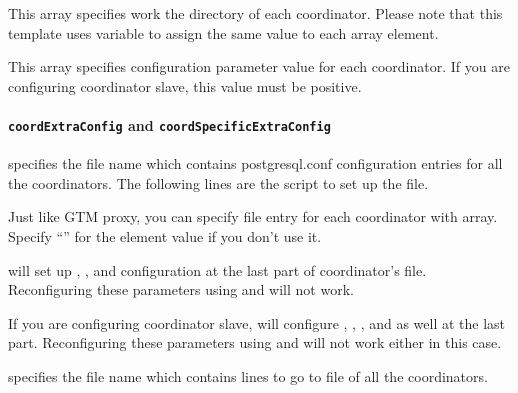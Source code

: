   			
      This array specifies work the directory of each coordinator.
      Please note that this template uses variable  to assign the same value to
	  each array element.
  			
  			
      This array specifies  configuration parameter value for each coordinator.
      If you are configuring coordinator slave, this value must be positive.
  			
  \paragraph*{{\tt coordExtraConfig} and {\tt coordSpecificExtraConfig}}
  			
       specifies the file name which contains postgresql.conf
	  configuration entries for all the coordinators.
      The following lines are the script to set up the file.
      			
      Just like GTM proxy, you can specify  file entry for each coordinator
	  with  array.
      Specify ``'' for the element value if you don't use it.
      			
       will set up , ,  and
	   configuration at the last part of coordinator's  file.
      Reconfiguring these parameters using  and 
	  will not work.
      			
      If you are configuring coordinator slave,  will configure ,
	  , , and  as well
	  at the last part.
      Reconfiguring these parameters using  and 
	  will not work either in this case.
  			
  \vspace{-3pt} 
  			
       specifies the file name which contains lines to go to
	   file of all the coordinators.
      			
